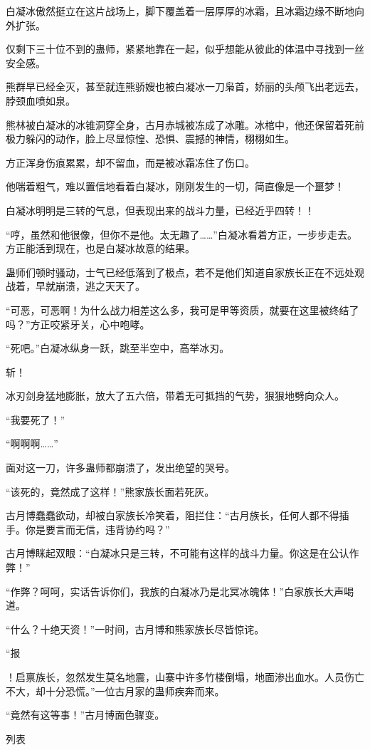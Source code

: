 \begin{this_body}
白凝冰傲然挺立在这片战场上，脚下覆盖着一层厚厚的冰霜，且冰霜边缘不断地向外扩张。

仅剩下三十位不到的蛊师，紧紧地靠在一起，似乎想能从彼此的体温中寻找到一丝安全感。

熊群早已经全灭，甚至就连熊骄嫂也被白凝冰一刀枭首，娇丽的头颅飞出老远去，脖颈血喷如泉。

熊林被白凝冰的冰锥洞穿全身，古月赤城被冻成了冰雕。冰棺中，他还保留着死前极力躲闪的动作，脸上尽显惊惶、恐惧、震撼的神情，栩栩如生。

方正浑身伤痕累累，却不留血，而是被冰霜冻住了伤口。

他喘着粗气，难以置信地看着白凝冰，刚刚发生的一切，简直像是一个噩梦！

白凝冰明明是三转的气息，但表现出来的战斗力量，已经近乎四转！！

“哼，虽然和他很像，但你不是他。太无趣了……”白凝冰看着方正，一步步走去。方正能活到现在，也是白凝冰故意的结果。

蛊师们顿时骚动，士气已经低落到了极点，若不是他们知道自家族长正在不远处观战着，早就崩溃，逃之天天了。

“可恶，可恶啊！为什么战力相差这么多，我可是甲等资质，就要在这里被终结了吗？”方正咬紧牙关，心中咆哮。

“死吧。”白凝冰纵身一跃，跳至半空中，高举冰刃。

斩！

冰刃剑身猛地膨胀，放大了五六倍，带着无可抵挡的气势，狠狠地劈向众人。

“我要死了！”

“啊啊啊……”

面对这一刀，许多蛊师都崩溃了，发出绝望的哭号。

“该死的，竟然成了这样！”熊家族长面若死灰。

古月博蠢蠢欲动，却被白家族长冷笑着，阻拦住：“古月族长，任何人都不得插手。你是要言而无信，违背协约吗？”

古月博眯起双眼：“白凝冰只是三转，不可能有这样的战斗力量。你这是在公认作弊！”

“作弊？呵呵，实话告诉你们，我族的白凝冰乃是北冥冰魄体！”白家族长大声喝道。

“什么？十绝天资！”一时间，古月博和熊家族长尽皆惊诧。

“报

！启禀族长，忽然发生莫名地震，山寨中许多竹楼倒塌，地面渗出血水。人员伤亡不大，却十分恐慌。”一位古月家的蛊师疾奔而来。

“竟然有这等事！”古月博面色骤变。

列表

\end{this_body}

